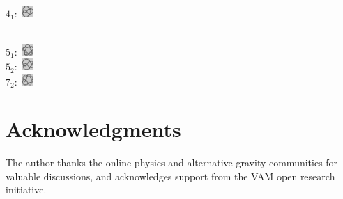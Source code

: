\documentclass[12pt,aps,prd,onecolumn,nofootinbib,superscriptaddress]{revtex4-2}
\begin{document}
 \( 4_1 \):~\includegraphics[height=1.2em]{images/4_1}
\\
 \( 5_1 \):~\includegraphics[height=1.2em]{images/5_1}\\
 \( 5_2 \):~\includegraphics[height=1.2em]{images/5_2}\\
 \( 7_2 \):~\includegraphics[height=1.2em]{images/7_2}\\







\appendix

\section*{Acknowledgments}
The author thanks the online physics and alternative gravity communities for valuable discussions, and acknowledges support from the VAM open research initiative.



\end{document}
